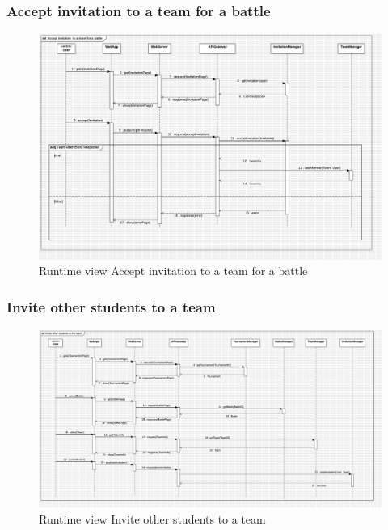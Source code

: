 \begin{itemize}
\subsubsection*{Accept invitation to a team for a battle}
\begin{figure}[H]
    \centering
    \includegraphics[width=\textwidth]{Diagrams/AcceptInvitationSD.jpg}
    \caption{Runtime view Accept invitation to a team for a battle}
    \label{fig:runtime_view_accept_invitation}
\end{figure}
\subsubsection*{Invite other students to a team}
\begin{figure}[H]
    \centering
    \includegraphics[width=\textwidth]{Diagrams/InviteStudentSD.jpg}
    \caption{Runtime view Invite other students to a team}
    \label{fig:runtime_view_invite_student}
\end{figure}


\end{itemize}
